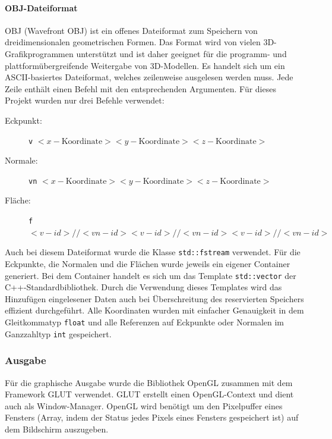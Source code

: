 \documentclass[crop=false]{standalone}
\begin{document}
        \paragraph{OBJ-Dateiformat}
        OBJ (Wavefront OBJ) ist ein offenes Dateiformat zum Speichern von dreidimensionalen geometrischen Formen.
        Das Format wird von vielen 3D-Grafikprogrammen unterstützt und ist daher geeignet für die programm- und plattformübergreifende Weitergabe von 3D-Modellen.
        Es handelt sich um ein ASCII-basiertes Dateiformat, welches zeilenweise ausgelesen werden muss.
        Jede Zeile enthält einen Befehl mit den entsprechenden Argumenten.
        Für dieses Projekt wurden nur drei Befehle verwendet:
        \begin{description}
          \item[Eckpunkt:] \texttt{v} $<x-\mathrm{Koordinate}> <y-\mathrm{Koordinate}> <z-\mathrm{Koordinate}>$
          \item[Normale:]
            \texttt{vn} $<x-\mathrm{Koordinate}> <y-\mathrm{Koordinate}> <z-\mathrm{Koordinate}>$
          \item[Fläche:]
            \texttt{f} $<v-id>//<vn-id> <v-id>//<vn-id> <v-id>//<vn-id>$
        \end{description}

        Auch bei diesem Dateiformat wurde die Klasse \texttt{std::fstream} verwendet.
        Für die Eckpunkte, die Normalen und die Flächen wurde jeweils ein eigener Container generiert.
        Bei dem Container handelt es sich um das Template \texttt{std::vector} der C++-Standardbibliothek.
        Durch die Verwendung dieses Templates wird das Hinzufügen eingelesener Daten auch bei Überschreitung des reservierten Speichers effizient durchgeführt.
        Alle Koordinaten wurden mit einfacher Genauigkeit in dem Gleitkommatyp \texttt{float} und alle Referenzen auf Eckpunkte oder Normalen im Ganzzahltyp \texttt{int} gespeichert.

      \subsubsection{Ausgabe} %
      \label{ssub:ausgabe}
        Für die graphische Ausgabe wurde die Bibliothek OpenGL zusammen mit dem Framework GLUT verwendet.
        GLUT erstellt einen OpenGL-Context und dient auch als Window-Manager.
        OpenGL wird benötigt um den Pixelpuffer eines Fensters (Array, indem der Status jedes Pixels eines Fensters gespeichert ist) auf dem Bildschirm auszugeben.
\end{document}
